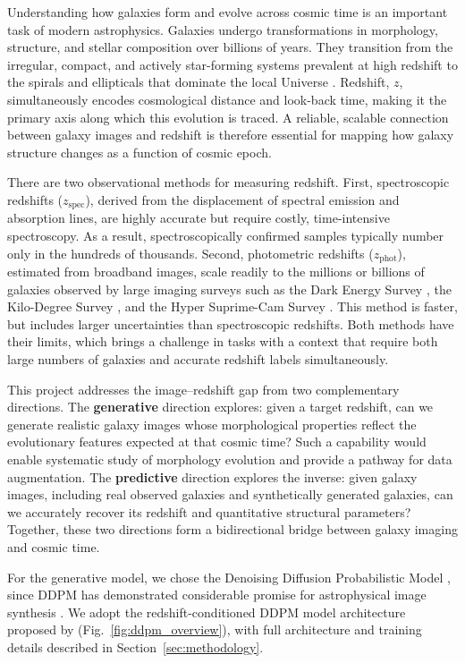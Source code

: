 \documentclass[fleqn,usenatbib]{mnras}
\begin{document}
Understanding how galaxies form and evolve across cosmic time is an important task of modern
astrophysics. Galaxies undergo transformations in
morphology, structure, and stellar composition over billions of years. They transition from
the irregular, compact, and actively star-forming systems prevalent at high redshift to the
spirals and ellipticals that dominate the local Universe
\citep{abraham1996, conselice2014}. Redshift, $z$, simultaneously encodes cosmological distance
and look-back time, making it the primary axis along which this evolution is traced.
A reliable, scalable connection between galaxy images and redshift is therefore essential
for mapping how galaxy structure changes as a function of cosmic epoch.

There are two observational methods for measuring redshift. First, spectroscopic redshifts
($z_{\mathrm{spec}}$), derived from the displacement of spectral emission and absorption
lines, are highly accurate but require costly, time-intensive spectroscopy. As a result,
spectroscopically confirmed samples typically number only in the hundreds of thousands.
Second, photometric redshifts ($z_{\mathrm{phot}}$), estimated from broadband images, scale
readily to the millions or billions of galaxies observed by large imaging surveys such as the Dark Energy Survey
\citep[DES]{abbott2022}, the Kilo-Degree Survey \citep[KiDS]{kuijken2019}, and the
Hyper Suprime-Cam Survey \citep[HSC]{aihara2018, aihara2019}. This method is faster, but includes 
larger uncertainties than spectroscopic redshifts. Both methods have their limits, which brings a challenge in tasks with a context that require both large
numbers of galaxies and accurate redshift labels simultaneously.

This project addresses the image--redshift gap from two complementary directions.
The \textbf{generative }direction explores: given a target redshift, can we generate realistic
galaxy images whose morphological properties reflect the evolutionary features expected at
that cosmic time? Such a capability would enable systematic study of
morphology evolution and provide a pathway for data augmentation.
The \textbf{predictive} direction explores the inverse: given galaxy images, including real observed galaxies
 and synthetically generated galaxies, can we accurately recover its redshift and quantitative
structural parameters?
Together, these two directions form a bidirectional bridge between galaxy imaging and
cosmic time.

For the generative model, we chose the Denoising Diffusion
Probabilistic Model \citep[DDPM;][]{ho2020}, since DDPM has demonstrated considerable promise for astrophysical
image synthesis \citep{lizarraga2024, xue2023, smith2022}. We adopt the redshift-conditioned DDPM model architecture proposed by
\citet{lizarraga2024} (Fig.~\ref{fig:ddpm_overview}), with full architecture
and training details described in Section~\ref{sec:methodology}.
\end{document}
